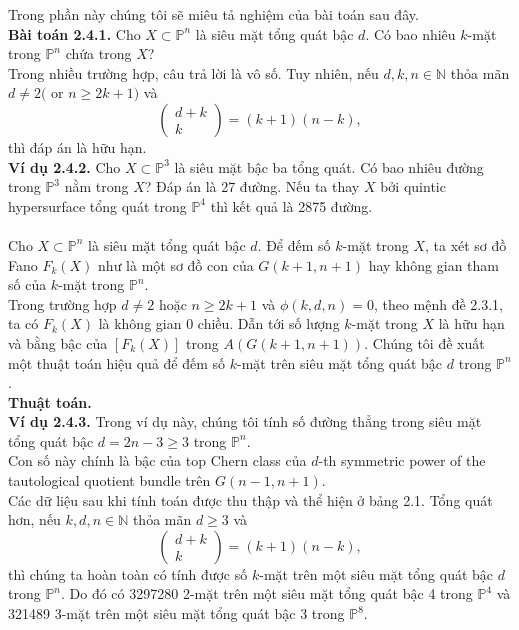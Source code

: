\documentclass[11pt,a4paper]{book}
\begin{document}
Trong phần này chúng tôi sẽ miêu tả nghiệm của bài toán sau đây.\\
\textbf{Bài toán 2.4.1.} Cho $X \subset \mathbb{P}^n$ là siêu mặt tổng quát bậc $d$. Có bao nhiêu $k$-mặt trong $\mathbb{P}^n$ chứa trong $X$?\\
Trong nhiều trường hợp, câu trả lời là vô số. Tuy nhiên, nếu $d, k, n \in \mathbb{N}$ thỏa mãn $d \neq 2($ or $n \geq 2 k+1)$ và
$$\left(\begin{array}{c}
	d+k \\
	k
\end{array}\right)=(k+1)(n-k),$$
thì đáp án là hữu hạn.\\
\textbf{Ví dụ 2.4.2.} Cho $X \subset \mathbb{P}^3$ là siêu mặt bậc ba tổng quát. Có bao nhiêu đường trong $\mathbb{P}^3$ nằm trong $X$? Đáp án là 27 đường. Nếu ta thay $X$ bởi quintic hypersurface tổng quát trong $\mathbb{P}^4$ thì kết quả là 2875 đường.\\\\
Cho $X \subset \mathbb{P}^n$ là siêu mặt tổng quát bậc $d$. Để đếm số $k$-mặt trong $X$, ta xét sơ đồ Fano $F_k(X)$ như là một sơ đồ con của $G(k+1, n+1)$ hay không gian tham số của $k$-mặt trong $\mathbb{P}^n$.\\
Trong trường hợp $d \neq 2$ hoặc $n \geq 2 k+1$ và $\phi(k, d, n)=0$, theo mệnh đề 2.3.1, ta có $F_k(X)$ là không gian 0 chiều. Dẫn tới số lượng $k$-mặt trong $X$ là hữu hạn và bằng bậc của $\left[F_k(X)\right]$ trong $A(G(k+1, n+1))$. Chúng tôi đề xuất một thuật toán hiệu quả để đếm số $k$-mặt trên siêu mặt tổng quát bậc $d$ trong $\mathbb{P}^n$.\\
\textbf{Thuật toán.}\\
\textbf{Ví dụ 2.4.3.} Trong ví dụ này, chúng tôi tính số đường thẳng trong siêu mặt tổng quát bậc $d=2 n-3 \geq 3$ trong $\mathbb{P}^n$.\\
Con số này chính là bậc của top Chern class của $d$-th symmetric power of the tautological quotient bundle trên $G(n-1, n+1)$.\\
Các dữ liệu sau khi tính toán được thu thập và thể hiện ở bảng 2.1. Tổng quát hơn, nếu $k, d, n \in \mathbb{N}$ thỏa mãn $d \geq 3$ và
$$
\left(\begin{array}{c}
	d+k \\
	k
\end{array}\right)=(k+1)(n-k),
$$
thì chúng ta hoàn toàn có tính được số $k$-mặt trên một siêu mặt tổng quát bậc $d$ trong $\mathbb{P}^n$.
Do đó có 3297280 2-mặt trên một siêu mặt tổng quát bậc 4 trong $\mathbb{P}^4$ và 321489 3-mặt trên một siêu mặt tổng quát bậc 3 trong $\mathbb{P}^8$.
\end{document}
